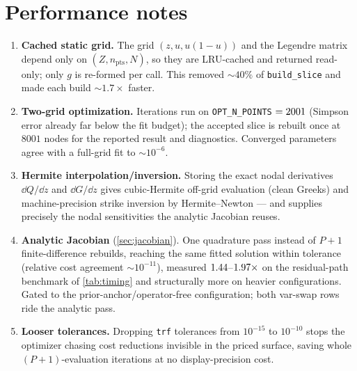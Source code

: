 \documentclass[11pt]{article}
\begin{document}
\section{Performance notes}
\label{app:perf}

\begin{enumerate}[leftmargin=1.6em]
\item \textbf{Cached static grid.}  The grid $(z,u,u(1-u))$ and the Legendre
matrix depend only on $(Z,n_{\text{pts}},N)$, so they are LRU-cached and
returned read-only; only $g$ is re-formed per call.  This removed
$\sim40\%$ of \texttt{build\_slice} and made each build $\sim1.7\times$
faster.
\item \textbf{Two-grid optimization.}  Iterations run on
\texttt{OPT\_N\_POINTS} $=2001$ (Simpson error already far below the
fit budget); the accepted slice is rebuilt once at $8001$ nodes for the
reported result and diagnostics.  Converged parameters agree with a
full-grid fit to $\sim10^{-6}$.
\item \textbf{Hermite interpolation/inversion.}  Storing the exact nodal
derivatives $\dd Q/\dd z$ and $\dd G/\dd z$ gives cubic-Hermite off-grid
evaluation (clean Greeks) and machine-precision strike inversion by
Hermite--Newton --- and supplies precisely the nodal sensitivities the
analytic Jacobian reuses.
\item \textbf{Analytic Jacobian} (\cref{sec:jacobian}).  One quadrature pass
instead of $P+1$ finite-difference rebuilds, reaching the same fitted
solution within tolerance (relative cost agreement $\sim10^{-11}$), measured
$1.44$--$1.97\times$ on the residual-path benchmark of
\cref{tab:timing} and structurally more on heavier configurations.  Gated to
the prior-anchor/operator-free configuration; both var-swap rows ride the
analytic pass.
\item \textbf{Looser tolerances.}  Dropping \texttt{trf} tolerances from
$10^{-15}$ to $10^{-10}$ stops the optimizer chasing cost reductions
invisible in the priced surface, saving whole $(P{+}1)$-evaluation
iterations at no display-precision cost.
\end{enumerate}
\end{document}

